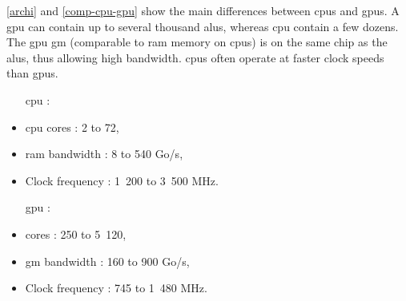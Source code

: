 \appendix

\label{principegpu}

\autoref{archi} and \autoref{comp-cpu-gpu} show the main differences between \glspl{cpu} and \glspl{gpu}. 
A \gls{gpu} can contain up to several thousand \glspl{alu}, whereas \gls{cpu} contain a few dozens.
The \gls{gpu} \gls{gm} (comparable to \gls{ram} memory on \glspl{cpu}) is on the same chip as the \glspl{alu}, thus allowing high bandwidth.
\glspl{cpu} often operate at faster clock speeds than \glspl{gpu}.

\begin{table}[H]
\begin{multicols}{2}
\begin{itemize}
\item [\gls{cpu} :]
\item \gls{cpu} cores : 2 to 72,
\item \gls{ram} bandwidth : 8 to 540 Go/s,
\item Clock frequency : 1~200 to 3~500 MHz.
\end{itemize}
\columnbreak
\begin{itemize}
\item [\gls{gpu} :]
\item {} cores : 250 to 5~120,
\item \Gls{gm} bandwidth : 160 to 900 Go/s,
\item Clock frequency : 745 to 1~480 MHz.
\end{itemize}
\end{multicols}
\caption{Comparison of typical specifications of \glspl{cpu} and \glspl{gpu}}
\label{comp-cpu-gpu}
\end{table}



\label{partgpu}

